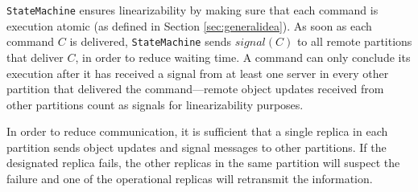 %

\verb#StateMachine# ensures linearizability by making sure that each command is execution atomic (as defined in Section \ref{sec:generalidea}). 
As soon as each command $C$ is delivered, \verb#StateMachine# sends $signal(C)$ to all remote partitions that deliver $C$, in order to reduce waiting time.
A command can only conclude its execution after it has received a signal from at least one server in every other partition that delivered the command---remote object updates received from other partitions count as signals for linearizability purposes.
%
%


In order to reduce communication, it is sufficient that a single replica in each partition sends object updates and signal messages to other partitions.
If the designated replica fails, the other replicas in the same partition will suspect the failure and one of the operational replicas will retransmit the information.


